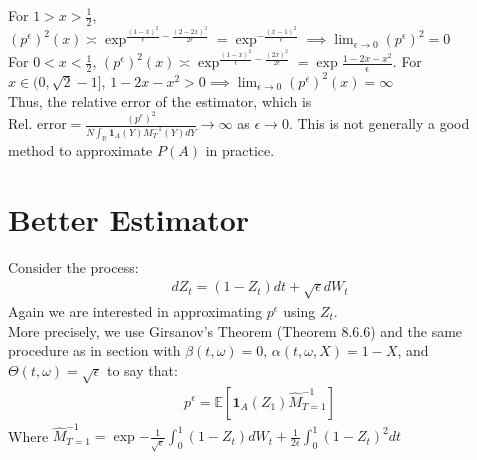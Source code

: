 \documentclass[11pt]{amsart}
\newcommand{\want}{p^{\epsilon}}
\newcommand{\noise}{\sqrt{\epsilon}}
\newcommand{\E}{\mathbb{E}}
\newcommand{\ind}{\mathbf{1}}
\newcommand{\R}{\mathbb{R}}
\begin{document}
For $1 > x > \frac{1}{2}$, $(\want)^2(x) \asymp \exp^{\frac{(1-x)^2}{\epsilon}-\frac{(2-2x)^2}{2\epsilon}} = \exp^{-\frac{(x-1)^2}{\epsilon}} \implies \lim_{\epsilon \to 0} (\want)^2 = 0$
\\
For $0 < x < \frac{1}{2}$, $(\want)^2(x) \asymp \exp^{\frac{(1-x)^2}{\epsilon}-\frac{(2x)^2}{2\epsilon}} = \exp{\frac{1-2x-x^2}{\epsilon}}$. For $x \in (0,\sqrt{2}-1]$, $1-2x-x^2 > 0 \implies \lim_{\epsilon \to 0} (\want)^2(x) = \infty$ 
\\
Thus, the relative error of the estimator, which is $\text{Rel. error} = \frac{(\want)^2}{N\int_{\R}\ind_{A}(Y)M^{-1}_{T}(Y) dY} \to \infty$ as $\epsilon \to 0$. This is not generally a good method to approximate $P(A)$ in practice. 

\section{Better Estimator}
Consider the process: 
\begin{align*}
dZ_t = (1-Z_t)dt + \noise dW_t
\end{align*}
Again we are interested in approximating $\want$ using $Z_t$. 
\\
More precisely, we use Girsanov's Theorem (Theorem 8.6.6) and the same procedure as in section with $\beta(t,\omega) = 0$, $\alpha(t,\omega,X) = 1-X$, and $\Theta(t,\omega) = \sqrt{\epsilon} $ to say that: 
\begin{align}
\want = \E\left [ \ind_{ A }(Z_1) \hat{M}_{T=1}^{-1} \right ] 
\end{align} 
Where $\hat{M}_{T=1}^{-1} = \exp{-\frac{1}{\sqrt{\epsilon}}\int_{0}^{1}(1-Z_t)dW_t + \frac{1}{2\epsilon}\int_{0}^{1}(1-Z_t)^2dt}$
\end{document}
